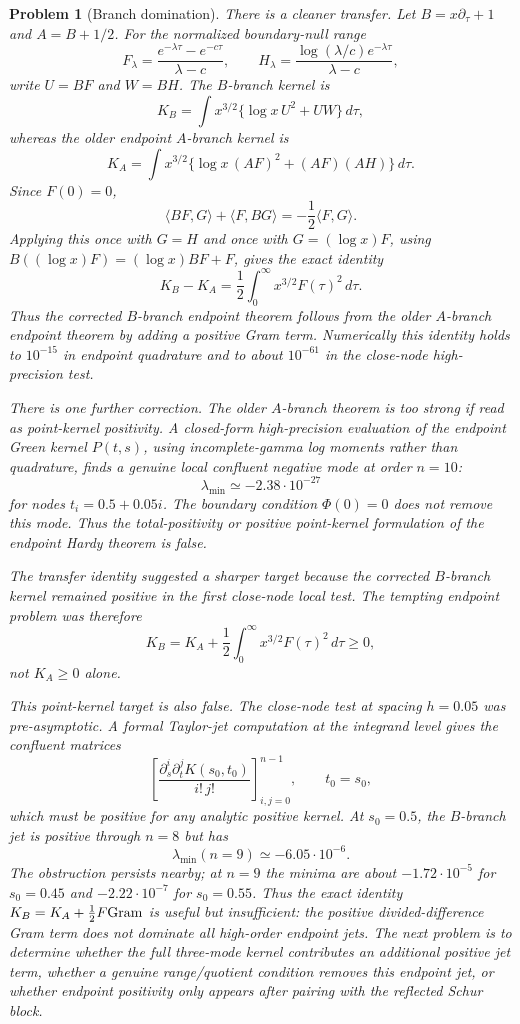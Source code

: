 \documentclass[11pt]{article}
\newtheorem{problem}[theorem]{Problem}
\begin{document}
\begin{problem}[Branch domination]
There is a cleaner transfer.  Let $B=x\partial_\tau+1$ and
$A=B+1/2$.  For the normalized boundary-null range
\[
  F_\lambda=\frac{e^{-\lambda\tau}-e^{-c\tau}}{\lambda-c},\qquad
  H_\lambda=\frac{\log(\lambda/c)e^{-\lambda\tau}}{\lambda-c},
\]
write $U=BF$ and $W=BH$.  The $B$-branch kernel is
\[
  K_B=\int x^{3/2}\{\log x\,U^2+UW\}\,d\tau ,
\]
whereas the older endpoint $A$-branch kernel is
\[
  K_A=\int x^{3/2}\{\log x\,(AF)^2+(AF)(AH)\}\,d\tau .
\]
Since $F(0)=0$,
\[
  \langle BF,G\rangle+\langle F,BG\rangle=-\frac12\langle F,G\rangle.
\]
Applying this once with $G=H$ and once with $G=(\log x)F$, using
$B((\log x)F)=(\log x)BF+F$, gives the exact identity
\[
  K_B-K_A=\frac12\int_0^\infty x^{3/2}F(\tau)^2\,d\tau .
\]
Thus the corrected $B$-branch endpoint theorem follows from the older
$A$-branch endpoint theorem by adding a positive Gram term.  Numerically this
identity holds to $10^{-15}$ in endpoint quadrature and to about $10^{-61}$ in
the close-node high-precision test.

There is one further correction.  The older $A$-branch theorem is too strong if
read as point-kernel positivity.  A closed-form high-precision evaluation of
the endpoint Green kernel $P(t,s)$, using incomplete-gamma log moments rather
than quadrature, finds a genuine local confluent negative mode at order
$n=10$:
\[
  \lambda_{\min}\simeq -2.38\cdot10^{-27}
\]
for nodes $t_i=0.5+0.05i$.  The boundary condition $\Phi(0)=0$ does not remove
this mode.  Thus the total-positivity or positive point-kernel formulation of
the endpoint Hardy theorem is false.

The transfer identity suggested a sharper target because the corrected
$B$-branch kernel remained positive in the first close-node local test.  The
tempting endpoint problem was therefore
\[
  K_B=K_A+\frac12\int_0^\infty x^{3/2}F(\tau)^2\,d\tau\ge0,
\]
not $K_A\ge0$ alone.

This point-kernel target is also false.  The close-node test at spacing
$h=0.05$ was pre-asymptotic.  A formal Taylor-jet computation at the integrand
level gives the confluent matrices
\[
  \left[\frac{\partial_s^i\partial_t^jK(s_0,t_0)}{i!\,j!}\right]_{i,j=0}^{n-1},
  \qquad t_0=s_0,
\]
which must be positive for any analytic positive kernel.  At $s_0=0.5$, the
$B$-branch jet is positive through $n=8$ but has
\[
  \lambda_{\min}(n=9)\simeq -6.05\cdot10^{-6}.
\]
The obstruction persists nearby; at $n=9$ the minima are about
$-1.72\cdot10^{-5}$ for $s_0=0.45$ and $-2.22\cdot10^{-7}$ for $s_0=0.55$.
Thus the exact identity $K_B=K_A+\frac12F{\rm Gram}$ is useful but insufficient:
the positive divided-difference Gram term does not dominate all high-order
endpoint jets.  The next problem is to determine whether the full three-mode
kernel contributes an additional positive jet term, whether a genuine
range/quotient condition removes this endpoint jet, or whether endpoint
positivity only appears after pairing with the reflected Schur block.


\end{problem}
\end{document}
